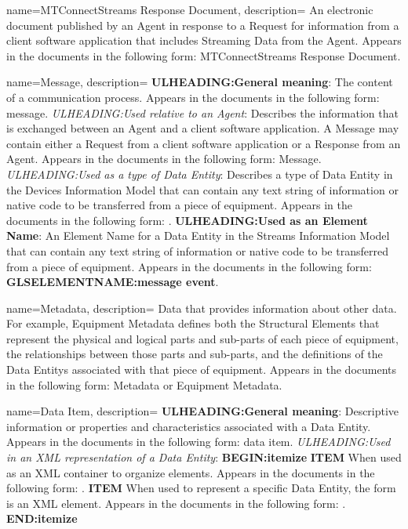 {
    name={MTConnectStreams Response Document},
	description={
	An electronic document published by an \gls{Agent} in response to a \gls{Request} for information from a client software application that includes \gls{Streaming Data} from the \gls{Agent}.
	Appears in the documents in the following form: \gls{MTConnectStreams Response Document}.
}
}

{
    name={Message},
	description={
	\textbf{ULHEADING:General meaning}:
	The content of a communication process.
	Appears in the documents in the following form: message.
	\textit{ULHEADING:Used relative to an \gls{Agent}}:
	Describes the information that is exchanged between an \gls{Agent} and a client software application.  A \gls{Message} may contain either a \gls{Request} from a client software application or a \gls{Response} from an \gls{Agent}.
	Appears in the documents in the following form: \gls{Message}.
	\textit{ULHEADING:Used as a type of \gls{Data Entity}}:
	Describes a type of \gls{Data Entity} in the \gls{Devices Information Model} that can contain any text string of information or native code to be transferred from a piece of equipment.
	Appears in the documents in the following form: .
	\textbf{ULHEADING:Used as an Element Name}:
	An \gls{Element Name} for a \gls{Data Entity} in the \gls{Streams Information Model} that can contain any text string of information or native code to be transferred from a piece of equipment.
	Appears in the documents in the following form:  \textbf{GLSELEMENTNAME:message event}.
}
}

{
    name={Metadata},
	description={
	Data that provides information about other data.
	For example, \gls{Equipment Metadata} defines both the \glspl{Structural Element} that represent the physical and logical parts and sub-parts of each piece of equipment, the relationships between those parts and sub-parts, and the definitions of the \glspl{Data Entity} associated with that piece of equipment.
	Appears in the documents in the following form: \gls{Metadata} or \gls{Equipment Metadata}.
}
}

{
    name={Data Item},
	description={
	\textbf{ULHEADING:General meaning}:
	Descriptive information or properties and characteristics associated with a \gls{Data Entity}.
	Appears in the documents in the following form: data item.
	\textit{ULHEADING:Used in an XML representation of a \gls{Data Entity}}:
    \textbf{BEGIN:itemize}
	\textbf{ITEM} When used as an XML container to organize  elements.
	Appears in the documents in the following form: .
	\textbf{ITEM} When used to represent a specific \gls{Data Entity}, the form  is an XML element.  
	Appears in the documents in the following form: .
    \textbf{END:itemize}
}
}

